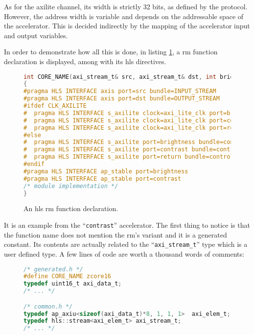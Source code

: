 As for the \gls{axilite} channel, its width is strictly 32 bits, as defined by the protocol.
However, the address width is variable and depends on the addressable space of the accelerator.
This is decided indirectly by the mapping of the accelerator input and output variables.

In order to demonstrate how all this is done, in listing \ref{lst:func-declaration},
a \gls{rm} function declaration is displayed, among with its \gls{hls} directives.
\vspace*{\fill}
\pagebreak
\begin{figure}[H]
\centering
\begin{lstlisting}[style=basic,language=C]
int CORE_NAME(axi_stream_t& src, axi_stream_t& dst, int brightness, int contrast)
{
#pragma HLS INTERFACE axis port=src bundle=INPUT_STREAM
#pragma HLS INTERFACE axis port=dst bundle=OUTPUT_STREAM
#ifdef CLK_AXILITE
#  pragma HLS INTERFACE s_axilite clock=axi_lite_clk port=brightness bundle=control offset=0x10
#  pragma HLS INTERFACE s_axilite clock=axi_lite_clk port=contrast bundle=control offset=0x18
#  pragma HLS INTERFACE s_axilite clock=axi_lite_clk port=return bundle=control offset=0x38
#else
#  pragma HLS INTERFACE s_axilite port=brightness bundle=control offset=0x10
#  pragma HLS INTERFACE s_axilite port=contrast bundle=control offset=0x18
#  pragma HLS INTERFACE s_axilite port=return bundle=control offset=0x38
#endif
#pragma HLS INTERFACE ap_stable port=brightness
#pragma HLS INTERFACE ap_stable port=contrast
/* module implementation */
}
\end{lstlisting}
\caption{An \gls{hls} \gls{rm} function declaration.}
\label{lst:func-declaration}
\end{figure}
It is an example from the ``\texttt{contrast}'' accelerator. 
The first thing to notice is that the function name does not 
mention the \gls{rm}'s variant and it is a generated constant. 
Its contents are actually related to the ``\texttt{axi\_stream\_t}'' type 
which is a user defined type. A few lines of code are worth a thousand words of comments:

\begin{figure}[H]
\centering
\begin{lstlisting}[style=basic,language=C]
/* generated.h */
#define CORE_NAME zcore16
typedef uint16_t axi_data_t;
/* ... */

/* common.h */
typedef ap_axiu<sizeof(axi_data_t)*8, 1, 1, 1>  axi_elem_t;
typedef hls::stream<axi_elem_t> axi_stream_t;
/* ... */
\end{lstlisting}
\end{figure}

